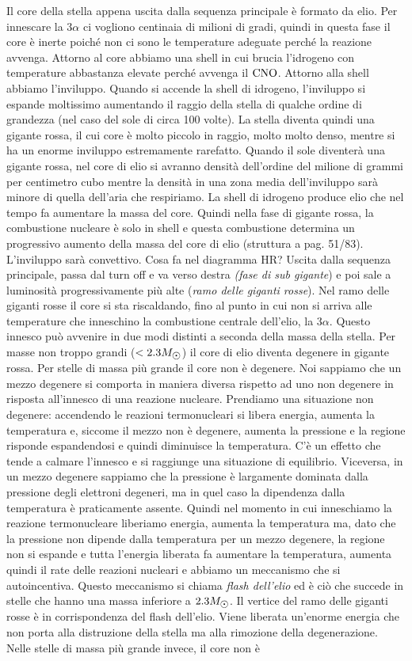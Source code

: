Il core della stella appena uscita dalla sequenza principale è formato da elio. Per innescare la $3\alpha$ ci vogliono centinaia di milioni di gradi, quindi in questa fase il core è inerte poiché non ci sono le temperature adeguate perché la reazione avvenga. Attorno al core abbiamo una shell in cui brucia l'idrogeno con temperature abbastanza elevate perché avvenga il $\ce{CNO}$. Attorno alla shell abbiamo l'inviluppo. Quando si accende la shell di idrogeno, l'inviluppo si espande moltissimo aumentando il raggio della stella di qualche ordine di grandezza (nel caso del sole di circa 100 volte). La stella diventa quindi una gigante rossa, il cui core è molto piccolo in raggio, molto molto denso, mentre si ha un enorme inviluppo estremamente rarefatto. Quando il sole diventerà una gigante rossa, nel core di elio si avranno densità dell'ordine del milione di grammi per centimetro cubo mentre la densità in una zona media dell'inviluppo sarà minore di quella dell'aria che respiriamo. La shell di idrogeno produce elio che nel tempo fa aumentare la massa del core. Quindi nella fase di gigante rossa, la combustione nucleare è solo in shell e questa combustione determina un progressivo aumento della massa del core di elio (struttura a pag. 51/83). L'inviluppo sarà convettivo. Cosa fa nel diagramma HR? Uscita dalla sequenza principale, passa dal turn off e va verso destra \textit{(fase di sub gigante}) e poi sale a luminosità progressivamente più alte (\textit{ramo delle giganti rosse}). Nel ramo delle giganti rosse il core si sta riscaldando, fino al punto in cui non si arriva alle temperature che inneschino la combustione centrale dell'elio, la $3\alpha$. Questo innesco può avvenire in due modi distinti a seconda della massa della stella. Per masse non troppo grandi ($<2.3\sunmass$) il core di elio diventa degenere in gigante rossa. Per stelle di massa più grande il core non è degenere. Noi sappiamo che un mezzo degenere si comporta in maniera diversa rispetto ad uno non degenere in risposta all'innesco di una reazione nucleare. Prendiamo una situazione non degenere: accendendo le reazioni termonucleari si libera energia, aumenta la temperatura e, siccome il mezzo non è degenere, aumenta la pressione e la regione risponde espandendosi e quindi diminuisce la temperatura. C'è un effetto che tende a calmare l'innesco e si raggiunge una situazione di equilibrio. Viceversa, in un mezzo degenere sappiamo che la pressione è largamente dominata dalla pressione degli elettroni degeneri, ma in quel caso la dipendenza dalla temperatura è praticamente assente. Quindi nel momento in cui inneschiamo la reazione termonucleare liberiamo energia, aumenta la temperatura ma, dato che la pressione non dipende dalla temperatura per un mezzo degenere, la regione non si espande e tutta l'energia liberata fa aumentare la temperatura, aumenta quindi il rate delle reazioni nucleari e abbiamo un meccanismo che si autoincentiva. Questo meccanismo si chiama \textit{flash dell'elio} ed è ciò che succede in stelle che hanno una massa inferiore a $2.3\sunmass$. Il vertice del ramo delle giganti rosse è in corrispondenza del flash dell'elio. Viene liberata un'enorme energia che non porta alla distruzione della stella ma alla rimozione della degenerazione. Nelle stelle di massa più grande invece, il core non è 
